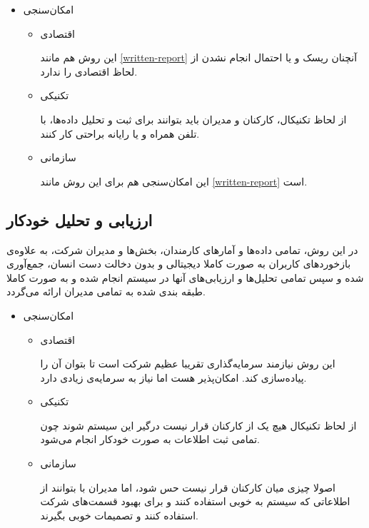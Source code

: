 \documentclass[12pt]{article}
\begin{document}
\begin{itemize}
    \item امکان‌سنجی
    
    \begin{itemize}
        \item 
        اقتصادی
        
           این روش هم مانند \ref{written-report} آنچنان ریسک و یا احتمال انجام نشدن از لحاظ اقتصادی را ندارد.
        \item 
        تکنیکی
        
        از لحاظ تکنیکال، کارکنان و مدیران باید بتوانند برای ثبت و تحلیل داده‌ها، با تلفن همراه و یا رایانه براحتی کار کنند.
        \item 
        سازمانی
        
        این امکان‌سنجی هم برای این روش مانند \ref{written-report} است.
        
    \end{itemize}
\end{itemize}

\subsection{ارزیابی و تحلیل خودکار }\label{full-digital}
در این روش، تمامی داده‌ها و آمار‌های کارمندان، بخش‌ها و مدیران شرکت، به علاوه‌ی بازخورد‌های کاربران به صورت کاملا دیجیتالی و بدون دخالت دست انسان، جمع‌آوری شده و سپس تمامی تحلیل‌ها و ارزیابی‌های آنها در سیستم  انجام شده و به صورت کاملا طبقه بندی شده به تمامی مدیران ارائه می‌گردد.

\begin{itemize}
    \item امکان‌سنجی
    
    \begin{itemize}
        \item 
        اقتصادی
        
        این روش نیازمند سرمایه‌گذاری تقریبا عظیم شرکت  است تا بتوان آن را پیاده‌سازی کند. امکان‌پذیر هست اما نیاز به سرمایه‌ی زیادی دارد.
        \item 
        تکنیکی
        
        از لحاظ تکنیکال هیچ یک از کارکنان قرار نیست درگیر این سیستم شوند چون تمامی ثبت اطلاعات به صورت خودکار انجام می‌شود.
        \item 
        سازمانی
        
        اصولا چیزی میان کارکنان قرار نیست حس شود، اما مدیران با بتوانند از اطلاعاتی که سیستم  به خوبی استفاده کنند و برای بهبود قسمت‌های شرکت استفاده کنند و تصمیمات خوبی بگیرند.
    \end{itemize}
\end{itemize}
\end{document}
